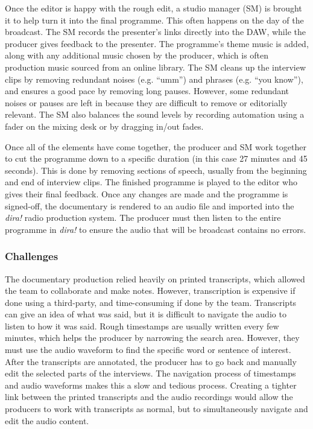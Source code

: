 Once the editor is happy with the rough edit, a studio manager (SM) is brought it to help turn it into the final
programme.  This often happens on the day of the broadcast.  The SM records the presenter's links directly into the
DAW, while the producer gives feedback to the presenter.  The programme's theme music is added, along with any
additional music chosen by the producer, which is often production music sourced from an online library.  The SM cleans
up the interview clips by removing redundant noises (e.g. ``umm'') and phrases (e.g. ``you know''), and ensures a good
pace by removing long pauses. However, some redundant noises or pauses are left in because they are difficult to remove
or editorially relevant.  The SM also balances the sound levels by recording automation using a fader on the mixing
desk or by dragging in/out fades. 

Once all of the elements have come together, the producer and SM work together to cut the programme down to a specific
duration (in this case 27 minutes and 45 seconds). This is done by removing sections of speech, usually from the
beginning and end of interview clips.  The finished programme is played to the editor who gives their final feedback.
Once any changes are made and the programme is signed-off, the documentary is rendered to an audio file and imported
into the \textit{dira!} radio production system. The producer must then listen to the entire programme in
\textit{dira!} to ensure the audio that will be broadcast contains no errors.

\subsubsection{Challenges}
The documentary production relied heavily on printed transcripts, which allowed the team to collaborate and make notes.
However, transcription is expensive if done using a third-party, and time-consuming if done by the team.  Transcripts
can give an idea of what was said, but it is difficult to navigate the audio to listen to how it was said. Rough
timestamps are usually written every few minutes, which helps the producer by narrowing the search area. However, they
must use the audio waveform to find the specific word or sentence of interest. After the transcripts are annotated,
the producer has to go back and manually edit the selected parts of the interviews. The navigation process of
timestamps and audio waveforms makes this a slow and tedious process.  Creating a tighter link between the printed
transcripts and the audio recordings would allow the producers to work with transcripts as normal, but to
simultaneously navigate and edit the audio content.

